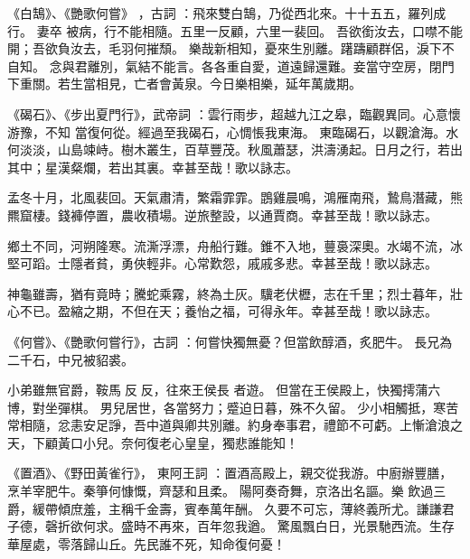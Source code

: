 \begin{pinyinscope}
《白鵠》、《艷歌何嘗》
 ，古詞
 ：飛來雙白鵠，乃從西北來。十十五五，羅列成行。
 妻卒
 被病，行不能相隨。五里一反顧，六里一裴回。
 吾欲銜汝去，口噤不能開；吾欲負汝去，毛羽何摧頹。
 樂哉新相知，憂來生別離。躇躊顧群侶，淚下不自知。
 念與君離別，氣結不能言。各各重自愛，道遠歸還難。妾當守空房，閉門下重關。若生當相見，亡者會黃泉。今日樂相樂，延年萬歲期。


《碣石》、《步出夏門行》，武帝詞
 ：雲行雨步，超越九江之皋，臨觀異同。心意懷游豫，不知
 當復何從。經過至我碣石，心惆悵我東海。
 東臨碣石，以觀滄海。水何淡淡，山島竦峙。樹木叢生，百草豐茂。秋風蕭瑟，洪濤湧起。日月之行，若出其中；星漢粲爛，若出其裏。幸甚至哉！歌以詠志。



 孟冬十月，北風裴回。天氣肅清，繁霜霏霏。鵾雞晨鳴，鴻雁南飛，鷙鳥潛藏，熊羆窟棲。錢褲停置，農收積場。逆旅整設，以通賈商。幸甚至哉！歌以詠志。





 鄉土不同，河朔隆寒。流澌浮漂，舟船行難。錐不入地，蘴裛深奧。水竭不流，冰
 堅可蹈。士隱者貧，勇俠輕非。心常歎怨，戚戚多悲。幸甚至哉！歌以詠志。





 神龜雖壽，猶有竟時；騰蛇乘霧，終為土灰。驥老伏櫪，志在千里；烈士暮年，壯心不已。盈縮之期，不但在天；養怡之福，可得永年。幸甚至哉！歌以詠志。




《何嘗》、《艷歌何嘗行》，古詞
 ：何嘗快獨無憂？但當飲醇酒，炙肥牛。
 長兄為二千石，中兄被貂裘。


 小弟雖無官爵，鞍馬反反，往來王侯長
 者遊。
 但當在王侯殿上，快獨摴蒲六博，對坐彈棋。
 男兒居世，各當努力；蹙迫日暮，殊不久留。
 少小相觸抵，寒苦常相隨，忿恚安足諍，吾中道與卿共別離。約身奉事君，禮節不可虧。上慚滄浪之天，下顧黃口小兒。奈何復老心皇皇，獨悲誰能知！




《置酒》、《野田黃雀行》，
 東阿王詞
 ：置酒高殿上，親交從我游。中廚辦豐膳，烹羊宰肥牛。秦箏何慷慨，齊瑟和且柔。
 陽阿奏奇舞，京洛出名謳。樂
 飲過三爵，緩帶傾庶羞，主稱千金壽，賓奉萬年酬。
 久要不可忘，薄終義所尤。謙謙君子德，磬折欲何求。盛時不再來，百年忽我遒。
 驚風飄白日，光景馳西流。生存華屋處，零落歸山丘。先民誰不死，知命復何憂！



\end{pinyinscope}
